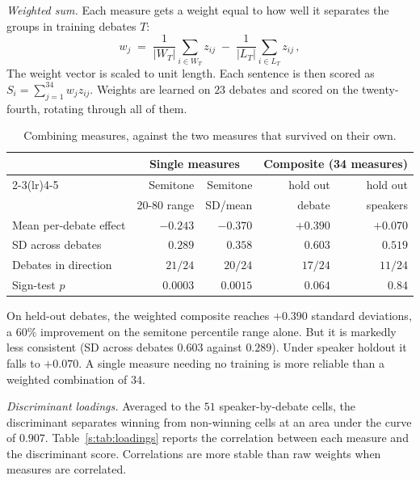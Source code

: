 \documentclass[pdflatex,sn-apa]{sn-jnl}%
\begin{document}
\emph{Weighted sum.} Each measure gets a weight equal to how well it
separates the groups in training debates $T$:
\begin{equation}
w_j \;=\; \frac{1}{|W_T|}\sum_{i \in W_T} z_{ij} \;-\;
          \frac{1}{|L_T|}\sum_{i \in L_T} z_{ij} \,,
\label{s:eq:weights}
\end{equation}
The weight vector is scaled to unit length. Each sentence is then scored
as $S_i = \sum_{j=1}^{34} w_j z_{ij}$. Weights are learned on $23$ debates
and scored on the twenty-fourth, rotating through all of them.

\begin{table}[!htbp]
\caption{Combining measures, against the two measures that survived on their
own.}
\label{s:tab:combine}
\centering
\scriptsize
\setlength{\tabcolsep}{2.5pt}
\begin{tabular}{lrrrr}
\toprule
 & \multicolumn{2}{c}{Single measures} & \multicolumn{2}{c}{Composite (34 measures)} \\
\cmidrule(lr){2-3}\cmidrule(lr){4-5}
 & Semitone & Semitone & hold out & hold out \\
 & 20-80 range & SD/mean & debate & speakers \\
\midrule
Mean per-debate effect & $-0.243$ & $\mathbf{-0.370}$ & $+0.390$ & $+0.070$ \\
SD across debates      & $0.289$  & $0.358$  & $0.603$ & $0.519$ \\
Debates in direction   & $21/24$  & $20/24$  & $17/24$ & $11/24$ \\
Sign-test $p$          & $0.0003$ & $0.0015$ & $0.064$ & $0.84$ \\
\bottomrule
\end{tabular}
\end{table}

On held-out debates, the weighted composite reaches $+0.390$ standard
deviations, a $60\%$ improvement on the semitone percentile range alone.
But it is markedly less consistent (SD across debates $0.603$ against
$0.289$). Under speaker holdout it falls to $+0.070$. A single measure
needing no training is more reliable than a weighted combination of $34$.

\emph{Discriminant loadings.} Averaged to the $51$ speaker-by-debate cells,
the discriminant separates winning from non-winning cells at an area under
the curve of $0.907$. Table~\ref{s:tab:loadings} reports the correlation
between each measure and the discriminant score. Correlations are more
stable than raw weights when measures are correlated.
\end{document}
